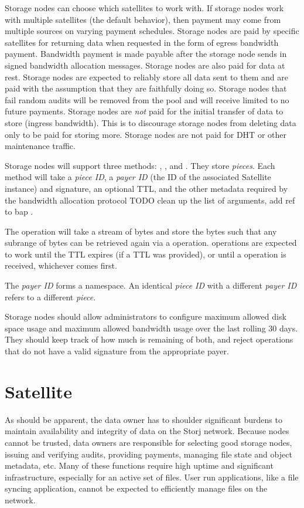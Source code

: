 \documentclass[11pt,fleqn,openany]{book}
\newcommand{\todo}[1]{{\color{red} TODO #1 }}
\begin{document}
Storage nodes can choose which satellites to work with. If storage nodes work
with
multiple satellites (the default behavior), then payment may come from
multiple sources on varying payment schedules.
Storage nodes are paid by specific satellites for returning data when
requested in
the form of egress bandwidth payment. Bandwidth payment is made payable after
the storage node sends in signed bandwidth allocation messages.
Storage nodes are also paid for data at rest.
Storage nodes are expected to reliably store all data sent to them and are
paid
with the assumption that they are faithfully doing so.
Storage nodes that fail random audits will be removed from the pool and will
receive
limited to no future payments.
Storage nodes are {\em not} paid for the initial transfer of data to store
(ingress
bandwidth). This is to discourage storage nodes from deleting data only to be
paid for
storing more. Storage nodes are not paid for DHT or other maintenance traffic.

Storage nodes will support three methods: , , and
. They store {\em pieces}.
Each method will take a {\em piece ID}, a {\em payer ID} (the ID of the
associated Satellite instance) and signature, an optional TTL,
and the other metadata required by the bandwidth allocation protocol
\todo{clean up the list of arguments, add ref to bap}.

The  operation will take a stream of bytes and store the bytes such
that any subrange of bytes can be retrieved again via a  operation.
 operations are expected to work until the TTL expires (if a TTL was
provided), or until a  operation is received, whichever comes
first.

The {\em payer ID} forms a namespace. An identical {\em piece ID} with a
different {\em payer ID} refers to a different {\em piece}.

Storage nodes should allow administrators to configure maximum allowed disk
space usage and maximum allowed bandwidth usage over the last rolling 30 days.
They should keep track of how much is remaining of both, and reject operations
that do not have a valid signature from the appropriate payer.

\section{Satellite}

As should be apparent, the data owner has to shoulder significant burdens
to maintain availability and integrity of data on the Storj network. Because
nodes cannot be trusted, data owners are responsible for selecting good
storage nodes, issuing and verifying audits, providing payments, managing file
state
and object metadata, etc. Many of these functions require high uptime and
significant infrastructure, especially for an active set of files. User run
applications, like a file syncing application, cannot be expected to efficiently
manage files on the network.
\end{document}

